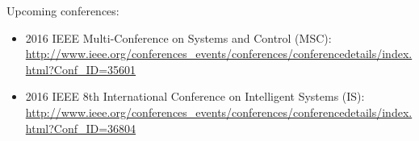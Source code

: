 \documentclass[a4paper,10pt]{article}
\begin{document}
Upcoming conferences:
\begin{itemize}
 \item 2016 IEEE Multi-Conference on Systems and Control (MSC): \url{http://www.ieee.org/conferences_events/conferences/conferencedetails/index.html?Conf_ID=35601}
 \item 2016 IEEE 8th International Conference on Intelligent Systems (IS): \url{http://www.ieee.org/conferences_events/conferences/conferencedetails/index.html?Conf_ID=36804}
\end{itemize}


\end{document}
